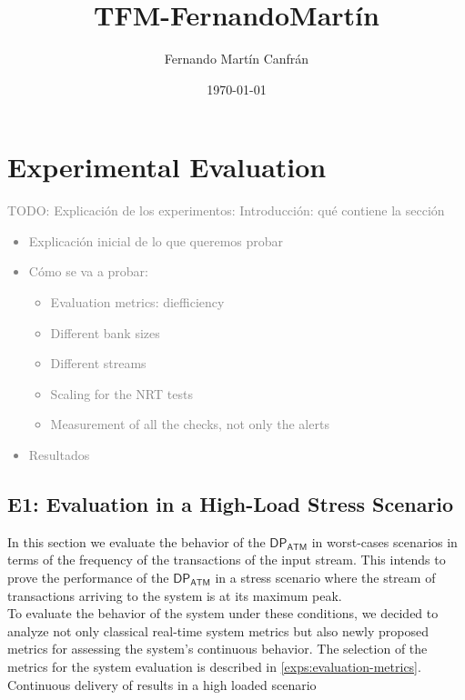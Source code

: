 \documentclass[12pt,a4paper]{article}
\title{TFM-FernandoMartín}
\author{Fernando Martín Canfrán}
\date{\today}
\newcommand{\DPATM}{$\mathsf{DP_{ATM}}$ }
\begin{document}
\maketitle

\newpage
\section{Experimental Evaluation}

\textcolor{gray}{TODO: Explicación de los experimentos:
Introducción: qué contiene la sección
\begin{itemize}
    \item Explicación inicial de lo que queremos probar
    \item Cómo se va a probar:
    \begin{itemize}
        \item Evaluation metrics: diefficiency
        \item Different bank sizes
        \item Different streams
        \item Scaling for the NRT tests
        \item Measurement of all the checks, not only the alerts
    \end{itemize}
    \item Resultados
\end{itemize}
}

\subsection*{E1: Evaluation in a High-Load Stress Scenario}

In this section we evaluate the behavior of the \DPATM in worst-cases scenarios in terms of the frequency of the transactions of the input stream. This intends to prove the performance of the \DPATM in a stress scenario where the stream of transactions arriving to the system is at its maximum peak.\\

To evaluate the behavior of the system under these conditions, we decided to analyze not only classical real-time system metrics but also newly proposed metrics for assessing the system's continuous behavior. The selection of the metrics for the system evaluation is described in \ref{exps:evaluation-metrics}.\\

Continuous delivery of results in a high loaded scenario
\end{document}
